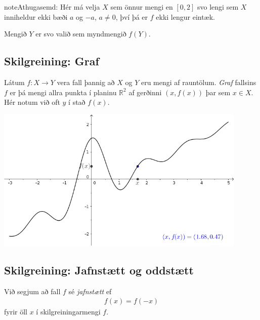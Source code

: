 \documentclass[a4paper,10pt,icelandic]{sphinxmanual}
\begin{document}
\begin{sphinxadmonition}{note}{Athugasemd:}
Hér má velja \(X\) sem önnur mengi en \([0,2]\) svo lengi sem
\(X\) inniheldur ekki bæði \(a\) og \(-a\), \(a\neq 0\),
því þá er \(f\) ekki lengur eintæk.

Mengið \(Y\) er svo valið sem myndmengið \(f(Y)\).
\end{sphinxadmonition}


\subsection{Skilgreining: Graf}
\label{\detokenize{kafli01:skilgreining-graf}}
Látum \(f:X \to Y\) vera fall þannig að \(X\)
og \(Y\) eru mengi af rauntölum. \textit{Graf} fallsins \(f\) er þá
mengi allra punkta í planinu \(\mathbb{R}^2\) af gerðinni
\((x,f(x))\) þar sem \(x\in X\). Hér notum við oft \(y\) í stað
\(f(x)\).


\begin{center}
\includegraphics[width=12cm,keepaspectratio=true]{04_Graf_falls.png}
\end{center}



\subsection{Skilgreining: Jafnstætt og oddstætt}
\label{\detokenize{kafli01:skilgreining-jafnstaett-og-oddstaett}}\label{\detokenize{kafli01:index-10}}
Við segjum að fall \(f\) sé \textit{jafnstætt} ef
\begin{equation*}
\begin{split}f(x) = f(-x)\end{split}
\end{equation*}
fyrir öll \(x\) í skilgreiningarmengi \(f\).
\end{document}
